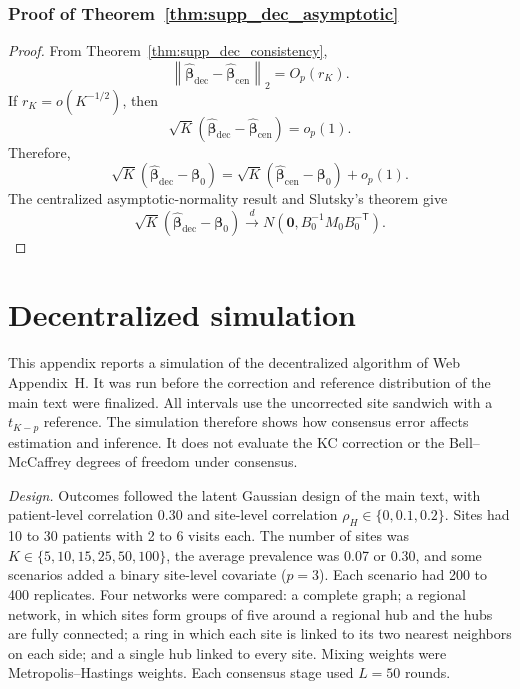 \documentclass[12pt]{article}
\theoremstyle{remark}
\numberwithin{equation}{section}
\newcommand{\trans}{\mathsf{T}}
\newcommand{\bbeta}{\boldsymbol{\beta}}
\newcommand{\bzero}{\mathbf 0}
\newcommand{\norm}[1]{\left\lVert#1\right\rVert}
\begin{document}
\subsubsection{Proof of Theorem~\ref{thm:supp_dec_asymptotic}}

\begin{proof}
From Theorem~\ref{thm:supp_dec_consistency},
\[
\norm{
\widehat{\bbeta}_{\mathrm{dec}}
-
\widehat{\bbeta}_{\mathrm{cen}}
}_2
=
O_p(r_K).
\]
If \(r_K=o(K^{-1/2})\), then
\[
\sqrt K
(\widehat{\bbeta}_{\mathrm{dec}}-\widehat{\bbeta}_{\mathrm{cen}})
=
o_p(1).
\]
Therefore,
\[
\sqrt K(\widehat{\bbeta}_{\mathrm{dec}}-\bbeta_0)
=
\sqrt K(\widehat{\bbeta}_{\mathrm{cen}}-\bbeta_0)
+
o_p(1).
\]
The centralized asymptotic-normality result and Slutsky's theorem give
\[
\sqrt K(\widehat{\bbeta}_{\mathrm{dec}}-\bbeta_0)
\xrightarrow{d}
N\left(\bzero,B_0^{-1}M_0B_0^{-\trans}\right).
\]
\end{proof}


\section{Decentralized simulation}
\label{app:I}

This appendix reports a simulation of the decentralized algorithm of Web
Appendix~H. It was run before the correction and reference distribution of the
main text were finalized. All intervals use the uncorrected site sandwich with a
$t_{K-p}$ reference. The simulation therefore shows how consensus error affects
estimation and inference. It does not evaluate the KC correction or the
Bell--McCaffrey degrees of freedom under consensus.

\emph{Design.} Outcomes followed the latent Gaussian design of the main text, with
patient-level correlation 0.30 and site-level correlation
$\rho_H\in\{0,0.1,0.2\}$. Sites had 10 to 30 patients with 2 to 6 visits each.
The number of sites was $K\in\{5,10,15,25,50,100\}$, the average prevalence was
0.07 or 0.30, and some scenarios added a binary site-level covariate ($p=3$).
Each scenario had 200 to 400 replicates. Four networks were compared: a complete
graph; a regional network, in which sites form groups of five around a regional
hub and the hubs are fully connected; a ring in which each site is linked to its
two nearest neighbors on each side; and a single hub linked to every site. Mixing
weights were Metropolis--Hastings weights. Each consensus stage used $L=50$
rounds.
\end{document}
